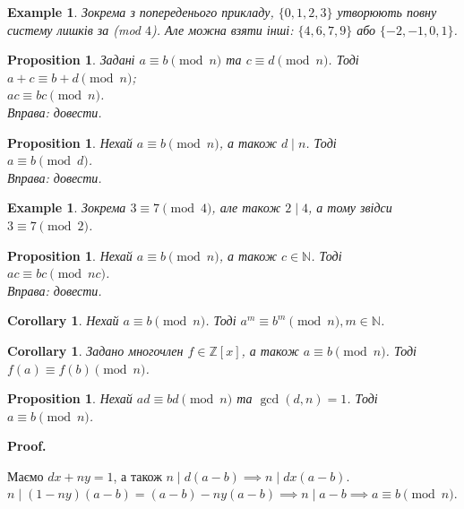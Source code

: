 \documentclass[a4paper, 14pt]{extarticle}
\makeatletter
\theoremstyle{theoremdd}
\theoremstyle{theoremdd}
\theoremstyle{theoremdd}
\theoremstyle{theoremdd}
\newtheorem{example}[theorem]{Example}
\theoremstyle{theoremdd}
\newtheorem{proposition}[theorem]{Proposition}
\theoremstyle{theoremdd}
\theoremstyle{theoremdd}
\theoremstyle{theoremdd}
\newtheorem{corollary}[theorem]{Corollary}
\def\qed{$\blacksquare$}
\renewenvironment{proof}[1][Proof.\\]{\par
\pushQED{\hfill \qed}%
\normalfont \topsep6\p@\@plus6\p@\relax
\trivlist
\item\relax
{\bfseries
#1\@addpunct{.}}\hspace\labelsep\ignorespaces
}{%
\popQED\endtrivlist\@endpefalse
}
\makeatother
\begin{document}
\begin{example}
Зокрема з попереденього прикладу, $\{0,1,2,3\}$ утворюють повну систему лишків за (mod $4$). Але можна взяти інші: $\{4,6,7,9\}$ або $\{-2,-1,0,1\}$.
\end{example}

\begin{proposition}
Задані $a \equiv b \pmod n$ та $c \equiv d \pmod n$. Тоді\\
$a + c \equiv b + d \pmod n$;\\
$ac \equiv bc \pmod n$.\\
\textit{Вправа: довести.}
\end{proposition}

\begin{proposition}
Нехай $a \equiv b \pmod n$, а також $d \mid n$. Тоді \\
$a \equiv b \pmod d$.\\
\textit{Вправа: довести.}
\end{proposition}

\begin{example}
Зокрема $3 \equiv 7 \pmod 4$, але також $2 \mid 4$, а тому звідси $3 \equiv 7 \pmod 2$.
\end{example}

\begin{proposition}
Нехай $a \equiv b \pmod n$, а також $c \in \mathbb{N}$. Тоді \\
$ac \equiv bc \pmod {nc}$.\\
\textit{Вправа: довести.}
\end{proposition}

\begin{corollary}
Нехай $a \equiv b \pmod n$. Тоді $a^m \equiv b^m \pmod n, m \in \mathbb{N}$.
\end{corollary}

\begin{corollary}
Задано многочлен $f \in \mathbb{Z}[x]$, а також $a \equiv b \pmod n$. Тоді $f(a) \equiv f(b) \pmod n$.
\end{corollary}

\begin{proposition}
Нехай $ad \equiv bd \pmod n$ та $\gcd(d,n) = 1$. Тоді \\
$a \equiv b \pmod n$.
\end{proposition}

\begin{proof}
Маємо $dx+ny = 1$, а також $n \mid d(a-b) \implies n \mid dx(a-b)$.\\
$n \mid (1-ny)(a-b) = (a-b) - ny(a-b) \implies n \mid a-b \implies a \equiv b \pmod n$.
\end{proof}
\end{document}
